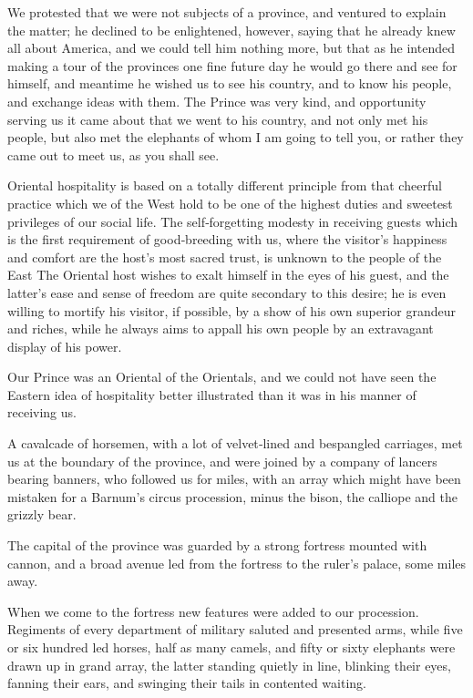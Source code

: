 \documentclass[12pt]{book}
\begin{document}
We protested that we were not subjects of a province, and ventured to explain
the matter; he declined to be enlightened, however, saying that he already knew
all about America, and we could tell him nothing more, but that as he intended
making a tour of the provinces one fine future day he would go there and see for
himself, and meantime he wished us to see his country, and to know his people,
and exchange ideas with them. The Prince was very kind, and opportunity serving
us it came about that we went to his country, and not only met his people, but
also met the elephants of whom I am going to tell you, or rather they came out to
meet us, as you shall see.

Oriental hospitality is based on a totally different principle from that cheerful
practice which we of the West hold to be one of the highest duties and sweetest
privileges of our social life. The self‐forgetting modesty in receiving guests which
is the first requirement of good‐breeding with us, where the visitor’s happiness
and comfort are the host’s most sacred trust, is unknown to the people of the East
The Oriental host wishes to exalt himself in the eyes of his guest, and the latter’s
ease and sense of freedom are quite secondary to this desire; he is even willing to
mortify his visitor, if possible, by a show of his own superior grandeur and riches,
while he always aims to appall his own people by an extravagant display of his
power.

Our Prince was an Oriental of the Orientals, and we could not have seen the
Eastern idea of hospitality better illustrated than it was in his manner of receiving
us.

A cavalcade of horsemen, with a lot of velvet‐lined and bespangled carriages,
met us at the boundary of the province, and were joined by a company of lancers
bearing banners, who followed us for miles, with an array which might have been
mistaken for a Barnum’s circus procession, minus the bison, the calliope and the
grizzly bear.

The capital of the province was guarded by a strong fortress mounted with
cannon, and a broad avenue led from the fortress to the ruler’s palace, some miles
away.

When we come to the fortress new features were added to our procession.
Regiments of every department of military saluted and presented arms, while five
or six hundred led horses, half as many camels, and fifty or sixty elephants were
drawn up in grand array, the latter standing quietly in line, blinking their eyes,
fanning their ears, and swinging their tails in contented waiting.
\end{document}
